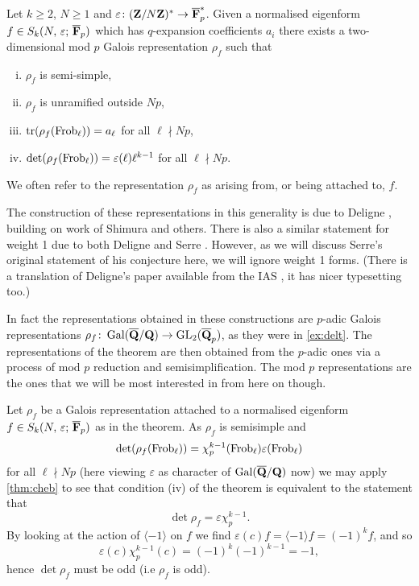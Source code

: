 \documentclass[a4paper,12pt]{article}
\begin{document}
\begin{thm}[Deligne]\label{thm:assoc}
Let $k \ge 2$, $N \ge 1$ and $\varepsilon\colon (\mathbf{Z}/N\mathbf{Z})^* \to \overline{\mathbf{F}}_p^*$. Given a normalised eigenform $f\in S_k(N,\,\varepsilon;\,\overline{\mathbf{F}}_p)$ which has $q$-expansion coefficients $a_i$ there exists a two-dimensional mod $p$ Galois representation $\rho_f$ such that
\begin{enumerate}[(i)]
\item $\rho_f$ is semi-simple,
\item $\rho_f$ is unramified outside $Np$,
\item $\operatorname{tr}(\rho_f (\operatorname{Frob}_\ell)) = a_\ell$ for all $\ell \nmid Np$,
\item $\det(\rho_f (\operatorname{Frob}_\ell)) = \varepsilon(\ell)\ell^{k-1}$ for all $\ell \nmid Np$.
\end{enumerate}
We often refer to the representation $\rho_f$ as arising from, or being attached to, $f$.
\end{thm}

The construction of these representations in this generality is due to Deligne \cite{Deligne}, building on work of Shimura and others.
There is also a similar statement for weight 1 due to both Deligne and Serre \cite{DeligneSerre}.
However, as we will discuss Serre's original statement of his conjecture here, we will ignore weight 1 forms.
(There is a translation of Deligne's paper available from the IAS \cite{DeligneEng}, it has nicer typesetting too.)

In fact the representations obtained in these constructions are $p$-adic Galois representations $\rho_f\colon \operatorname{Gal}(\overline{\mathbf{Q}}/\mathbf{Q}) \to \operatorname{GL}_2(\overline{\mathbf{Q}}_p)$, as they were in \cref{ex:delt}.
The representations of the theorem are then obtained from the $p$-adic ones via a process of mod $p$ reduction and semisimplification.
The mod $p$ representations are the ones that we will be most interested in from here on though.


\begin{rmk}\label{rmk:detrho}
Let $\rho_f$ be a Galois representation attached to a normalised eigenform $f\in S_k(N,\,\varepsilon;\,\overline{\mathbf{F}}_p)$ as in the theorem.
As $\rho_f$ is semisimple and
\[
\det(\rho_f(\operatorname{Frob}_\ell)) = \chi_p^{k-1}(\operatorname{Frob}_\ell)\varepsilon(\operatorname{Frob}_\ell)
\]
for all $\ell \nmid Np$ (here viewing $\varepsilon$ as character of $\operatorname{Gal}(\overline{\mathbf{Q}}/\mathbf{Q})$ now) we may apply \cref{thm:cheb} to see that condition (iv) of the theorem is equivalent to the statement that
\[
\det\rho_f = \varepsilon\chi_p^{k-1}.
\]
By looking at the action of $\langle-1\rangle$ on $f$ we find $\varepsilon(c)f = \langle -1 \rangle f = (-1)^k f$, and so%
\[
\varepsilon(c)\chi_p^{k-1}(c) = (-1)^k(-1)^{k-1} = -1,
\]
hence $\det\rho_f$ must be odd (i.e $\rho_f$ is odd).
\end{rmk}
\end{document}
